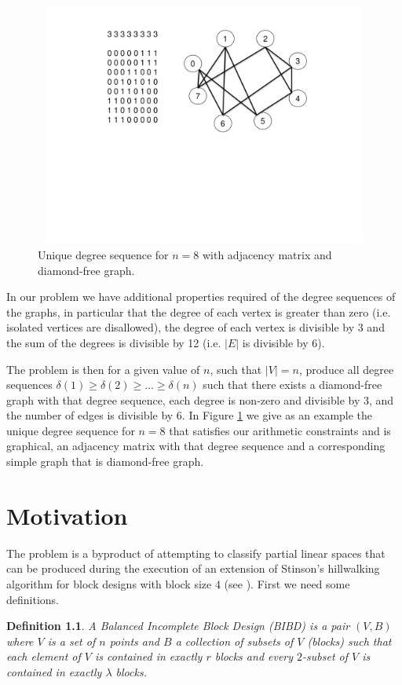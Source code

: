 \documentclass{l4proj}
\newtheorem{definition}{Definition}
\begin{document}
\begin{figure}
\centering
\includegraphics[height=8.0cm,width=12.0cm]{g8}
\vspace{-2cm}
\caption{Unique degree sequence for $n = 8$ with adjacency matrix and diamond-free graph.}
\label{fig:n8}
\end{figure}

In our problem we have additional properties required of the degree sequences of the graphs, in particular
that the degree of each vertex is greater than zero (i.e. isolated vertices are disallowed), the degree
of each vertex is divisible by 3 and the sum of the degrees is divisible by  12 (i.e. $|E|$ is divisible by  6).

The problem is then for a given value of $n$, such that $|V| = n$, produce all degree sequences 
$\delta(1) \geq \delta(2) \geq ... \geq \delta(n)$ such that there exists a diamond-free graph with that degree sequence,
each degree is non-zero and divisible by  3, and the number of edges is divisible by  6.
In Figure \ref{fig:n8} we give as an example the unique degree sequence for $n=8$ that satisfies our arithmetic constraints and 
is graphical, an adjacency matrix with that degree sequence and a corresponding simple graph that is diamond-free graph.

\chapter{Motivation}
\label{sec:motivation}
\vspace{-3mm}
The problem is a byproduct of attempting to classify
partial linear spaces that can be produced during the execution of an
extension of Stinson's hillwalking algorithm for block designs with
block size $4$ (see \cite{codihandbook}). First we need some definitions.
\begin{definition}
A Balanced Incomplete Block Design (BIBD) is a pair $(V,B)$ where $V$
is a set of $n$ points and $B$ a collection of subsets of $V$ (blocks)
such that each element of $V$ is contained in exactly $r$ blocks and
every $2$-subset 
of $V$ is contained in exactly $\lambda$ blocks.
\end{definition}
\end{document}
